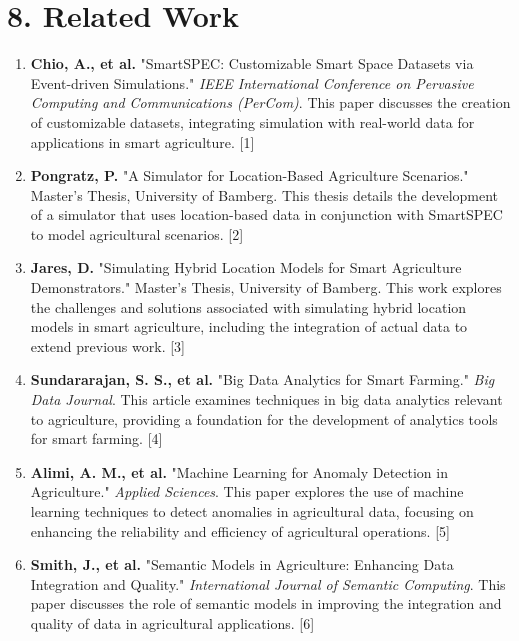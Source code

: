 \documentclass[11pt]{article}
\begin{document}
\section*{8. Related Work}
\begin{enumerate}[label=\arabic*., wide=0pt, left=0pt]
    \item \textbf{Chio, A., et al.} "SmartSPEC: Customizable Smart Space Datasets via Event-driven Simulations." \textit{IEEE International Conference on Pervasive Computing and Communications (PerCom)}. This paper discusses the creation of customizable datasets, integrating simulation with real-world data for applications in smart agriculture. [1]
    
    \item \textbf{Pongratz, P.} "A Simulator for Location-Based Agriculture Scenarios." Master's Thesis, University of Bamberg. This thesis details the development of a simulator that uses location-based data in conjunction with SmartSPEC to model agricultural scenarios. [2]
    
    \item \textbf{Jares, D.} "Simulating Hybrid Location Models for Smart Agriculture Demonstrators." Master's Thesis, University of Bamberg. This work explores the challenges and solutions associated with simulating hybrid location models in smart agriculture, including the integration of actual data to extend previous work. [3]
    
    \item \textbf{Sundararajan, S. S., et al.} "Big Data Analytics for Smart Farming." \textit{Big Data Journal}. This article examines techniques in big data analytics relevant to agriculture, providing a foundation for the development of analytics tools for smart farming. [4]
    
    \item \textbf{Alimi, A. M., et al.} "Machine Learning for Anomaly Detection in Agriculture." \textit{Applied Sciences}. This paper explores the use of machine learning techniques to detect anomalies in agricultural data, focusing on enhancing the reliability and efficiency of agricultural operations. [5]
    
    \item \textbf{Smith, J., et al.} "Semantic Models in Agriculture: Enhancing Data Integration and Quality." \textit{International Journal of Semantic Computing}. This paper discusses the role of semantic models in improving the integration and quality of data in agricultural applications. [6]
\end{enumerate}
\end{document}
